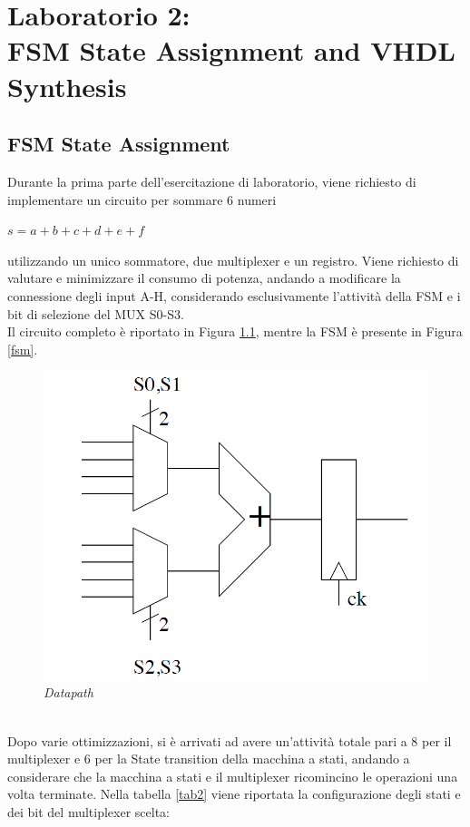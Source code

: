 \chapter{Laboratorio 2: \\FSM State Assignment and VHDL Synthesis}
\section{FSM State Assignment}
Durante la prima parte dell'esercitazione di laboratorio, viene richiesto di implementare un circuito per sommare 6 numeri
\begin{center}
	$s=a+b+c+d+e+f $
\end{center}
utilizzando un unico sommatore, due multiplexer e un registro. Viene richiesto di valutare e minimizzare il consumo di potenza, andando a modificare la connessione degli input A-H, considerando esclusivamente l'attività della FSM e i bit di selezione del MUX S0-S3.\\
Il circuito completo è riportato in Figura \ref{circuito}, mentre la FSM è presente in Figura \ref{fsm}.
\begin{figure}[!htb]
	\centering
	\includegraphics[scale=0.6]{immagini/circuito}
	\caption{\textit{Datapath}}
	\label{circuito}
\end{figure} \\
Dopo varie ottimizzazioni, si è arrivati ad avere un'attività totale pari a 8 per il multiplexer e 6 per la State transition della macchina a stati, andando a considerare che la macchina a stati e il multiplexer ricomincino le operazioni una volta terminate. Nella tabella \ref{tab2} viene riportata la configurazione degli stati e dei bit del multiplexer scelta:
